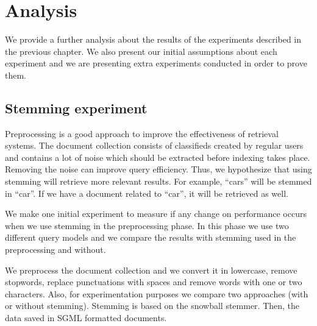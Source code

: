 \chapter{Analysis}

We provide a further analysis about the results of the experiments described in the previous chapter. We also present our initial assumptions about each experiment and we are presenting extra experiments conducted in order to prove them.

\section{Stemming experiment}

Preprocessing is a good approach to improve the effectiveness of retrieval systems. The document collection consists of classifieds created by regular users and contains a lot of noise which should be extracted before indexing takes place. Removing the noise can improve query efficiency. Thus, we hypothesize that using stemming will retrieve more relevant results. For example, ``cars'' will be stemmed in ``car''. If we have a document related to ``car'', it will be retrieved as well.

We make one initial experiment to measure if any change on performance occurs when we use stemming in the preprocessing phase. In this phase we use two different query models and we compare the results with stemming used in the preprocessing and without.

We preprocess the document collection and we convert it in lowercase, remove stopwords, replace punctuations with spaces and remove words with one or two characters. Also, for experimentation purposes we compare two approaches (with or without stemming). Stemming is based on the snowball stemmer. Then, the data saved in SGML formatted documents.




